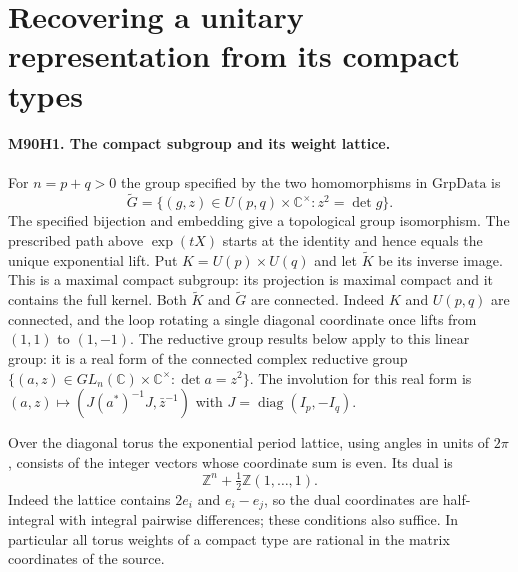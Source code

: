 \section{Recovering a unitary representation from its compact types}

\paragraph{M90H1. The compact subgroup and its weight lattice.}
For $n=p+q>0$ the group specified by the two homomorphisms in
$\mathrm{GrpData}$ is
\[
 \widetilde G=\{(g,z)\in U(p,q)\times{\mathbb C}^{\times}:z^2=\det g\}.
\]
The specified bijection and embedding give a topological group
isomorphism. The prescribed path above $\exp(tX)$ starts at the
identity and hence equals the unique exponential lift. Put
$K=U(p)\times U(q)$ and let $\widetilde K$ be its inverse image.
This is a maximal compact subgroup: its projection is maximal
compact and it contains the full kernel. Both $\widetilde K$ and
$\widetilde G$ are connected. Indeed $K$ and $U(p,q)$ are connected,
and the loop rotating a single diagonal coordinate once lifts from
$(1,1)$ to $(1,-1)$. The reductive group results below apply to
this linear group: it is a real form of the connected complex
reductive group $\{(a,z)\in GL_n({\mathbb C})\times
{\mathbb C}^{\times}:\det a=z^2\}$. The involution for this real
form is $(a,z)\mapsto(J(a^*)^{-1}J,\bar z^{-1})$ with
$J=\operatorname{diag}(I_p,-I_q)$.

Over the diagonal torus the exponential period lattice, using angles
in units of $2\pi$, consists of the integer vectors whose coordinate
sum is even. Its dual is
\[
   {\mathbb Z}^n+\tfrac12{\mathbb Z}(1,\ldots,1).
\]
Indeed the lattice contains $2e_i$ and $e_i-e_j$, so the dual
coordinates are half-integral with integral pairwise differences;
these conditions also suffice. In particular all torus weights of
a compact type are rational in the matrix coordinates of the source.

